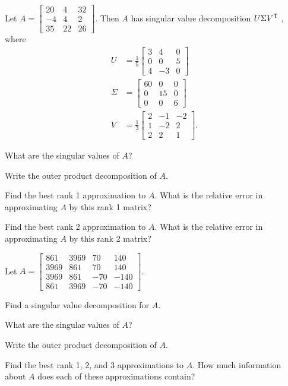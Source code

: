 \be
\item Let $A = \left[ \begin{array}{rcc} 20&4&32 \\ -4&4&2 \\ 35&22&26 \end{array} \right]$. Then $A$ has singular value decomposition $U \Sigma V^{\mathsf{T}}$ , where 
\begin{align*}
U &= \frac{1}{5}\left[ \begin{array}{crc} 3&4&0 \\ 0&0&5 \\ 4&-3&0 \end{array} \right] \\
\Sigma &= \left[ \begin{array}{crc} 60&0&0 \\ 0&15&0 \\ 0&0&6 \end{array} \right] \\
V &= \frac{1}{3}\left[ \begin{array}{crr} 2&-1&-2 \\ 1&-2&2 \\ 2&2&1 \end{array} \right].
\end{align*}
	\ba
	\item What are the singular values of $A$?
	\item Write the outer product decomposition of $A$. 
	\item Find the best rank 1 approximation to $A$. What is the relative error in approximating $A$ by this rank 1 matrix? 
	\item Find the best rank 2 approximation to $A$. What is the relative error in approximating $A$ by this rank 2 matrix?
	\ea

\item Let $A = \left[ \begin{array}{ccrr} 861&3969&70&140 \\ 3969&861&70&140 \\ 3969&861&-70&-140 \\ 861&3969&-70&-140 \end{array} \right]$. 
	\ba
	\item Find a singular value decomposition for $A$. 
	\item What are the singular values of $A$?
	\item Write the outer product decomposition of $A$. 
	\item Find the best rank 1, 2, and 3 approximations to $A$. How much information about $A$ does each of these approximations contain?
	\ea
	
